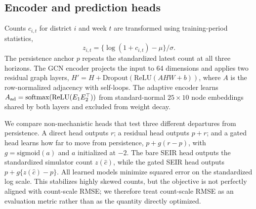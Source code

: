 \documentclass[conference]{IEEEtran}
\begin{document}
\subsection{Encoder and prediction heads}
Counts $c_{i,t}$ for district $i$ and week $t$ are transformed using training-period statistics,
\begin{equation}
z_{i,t}=\{\log(1+c_{i,t})-\mu\}/\sigma.
\label{eq:z}
\end{equation}
The persistence anchor $p$ repeats the standardized latest count at all three horizons.
The GCN encoder projects the input to 64 dimensions and applies two residual graph layers, $H'=H+\mathrm{Dropout}(\mathrm{ReLU}(AHW+b))$, where $A$ is the row-normalized adjacency with self-loops. %
The adaptive encoder learns $A_{\rm ad}=\mathrm{softmax}(\mathrm{ReLU}(E_1E_2^\top))$ from standard-normal $25\times10$ node embeddings shared by both layers and excluded from weight decay. %

We compare non-mechanistic heads that test three different departures from persistence.
A direct head outputs $r$; a residual head outputs $p+r$; and a gated head learns how far to move from persistence, $p+g(r-p)$, with $g=\mathrm{sigmoid}(a)$ and $a$ initialized at $-2$. %
The bare SEIR head outputs the standardized simulator count $z(\hat c)$, while the gated SEIR head outputs $p+g\{z(\hat c)-p\}$.
All learned models minimize squared error on the standardized log scale.
This stabilizes highly skewed counts, but the objective is not perfectly aligned with count-scale RMSE; we therefore treat count-scale RMSE as an evaluation metric rather than as the quantity directly optimized.
\end{document}
